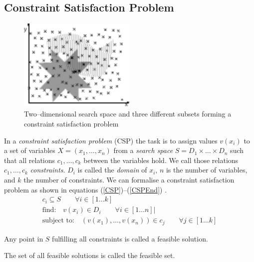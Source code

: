 \subsection{Constraint Satisfaction Problem}
\label{sec:MathConstraintProgramming}
\begin{figure}
\begin{center}
\includegraphics[width=0.5\textwidth]{./pics/SetIntersection.pdf}
\end{center}
\caption{Two--dimensional search space and three different subsets forming a constraint satisfaction problem}
\label{fig:CSPExample}
\end{figure}
In a \emph{constraint satisfaction problem} (CSP) the task is to assign values $v(x_i)$ to a set of variables $X = (x_1, \dots , x_n)$ from a \emph{search space} $S=D_1\times \dots \times D_n$ such that all relations $c_1,\dots,c_k$ between the variables hold. We call those relations $c_1,\dots,c_k$ \emph{constraints}. $D_i$ is called the \emph{domain} of $x_i$, $n$ is the number of variables, and $k$ the number of constraints. We can formalise a constraint satisfaction problem as shown in equations (\ref{CSP})--(\ref{CSPEnd}) \cite{Eiben97constraintsatisfaction}.
\begin{eqnarray} 
\label{CSP}
c_i \subseteq S \qquad\forall i \in \left[ 1 \dots k \right]\\
\text{find:} \quad v(x_i) \in D_i \qquad\forall i \in \left[ 1 \dots n \right]| \\
\label{CSPEnd}
\text{subject to:} \quad (v(x_1),\dots , v(x_n)) \in c_j\qquad\forall j \in \left[1 \dots k\right]
\end{eqnarray} 
\begin{definition}
Any point in $S$ fulfilling all constraints is called a feasible solution.
\end{definition}
\begin{definition}
The set of all feasible solutions is called the feasible set.
\end{definition}
